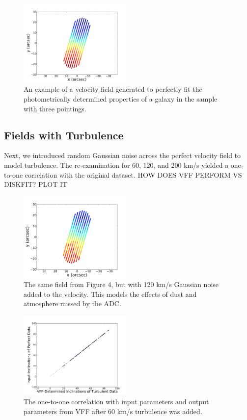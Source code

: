 \documentclass{emulateapj}
\begin{document}
\begin{figure}[h]
\includegraphics[width=0.5\textwidth]{perfectexamp.pdf}
\caption{An example of a velocity field generated to perfectly fit the photometrically determined properties of a galaxy in the sample with three pointings. \label{fig:test}}
\end{figure}

\subsection{Fields with Turbulence}
Next, we introduced random Gaussian noise across the perfect velocity field to model turbulence. The re-examination for 60, 120, and 200 km/s yielded a one-to-one correlation with the original dataset. HOW DOES VFF PERFORM VS DISKFIT? PLOT IT


\begin{figure}[h]
\includegraphics[width=0.5\textwidth]{turbexamp.pdf}
\caption{The same field from Figure 4, but with 120 km/s Gaussian noise added to the velocity. This models the effects of dust and atmosphere missed by the ADC.  \label{fig:test}}
\end{figure}

\begin{figure}[h]
\includegraphics[width=0.5\textwidth]{turbtest.pdf}
\caption{The one-to-one correlation with input parameters and output parameters from VFF after 60 km/s turbulence was added. \label{fig:test}}
\end{figure}
\end{document}

